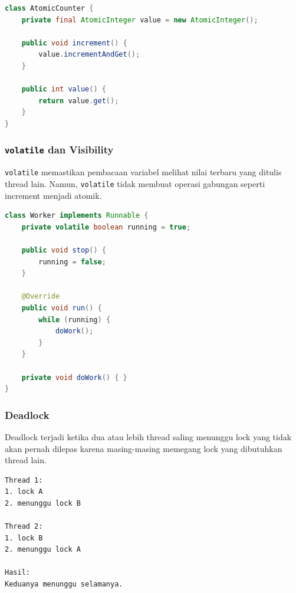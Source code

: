 \begin{lstlisting}[language=Java, caption={Counter thread-safe dengan AtomicInteger}, label={lst:atomic-counter}]
class AtomicCounter {
    private final AtomicInteger value = new AtomicInteger();

    public void increment() {
        value.incrementAndGet();
    }

    public int value() {
        return value.get();
    }
}
\end{lstlisting}

\subsubsection{\texttt{volatile} dan Visibility}

\begin{jawab}
\texttt{volatile} memastikan pembacaan variabel melihat nilai terbaru yang ditulis thread lain. Namun, \texttt{volatile} tidak membuat operasi gabungan seperti increment menjadi atomik.
\end{jawab}

\begin{lstlisting}[language=Java, caption={volatile untuk flag berhenti}, label={lst:volatile-flag}]
class Worker implements Runnable {
    private volatile boolean running = true;

    public void stop() {
        running = false;
    }

    @Override
    public void run() {
        while (running) {
            doWork();
        }
    }

    private void doWork() { }
}
\end{lstlisting}

\subsubsection{Deadlock}

\begin{jawab}
Deadlock terjadi ketika dua atau lebih thread saling menunggu lock yang tidak akan pernah dilepas karena masing-masing memegang lock yang dibutuhkan thread lain.
\end{jawab}

\begin{lstlisting}[caption={Pola deadlock konseptual}, label={lst:deadlock-pattern}]
Thread 1:
1. lock A
2. menunggu lock B

Thread 2:
1. lock B
2. menunggu lock A

Hasil:
Keduanya menunggu selamanya.
\end{lstlisting}

